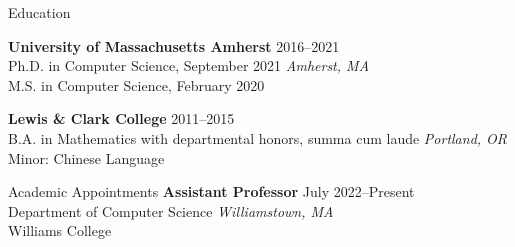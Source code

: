 \documentclass{resume} %
\begin{document}
%


\begin{rSection}{Education}

{\bf University of Massachusetts Amherst} \hfill {2016--2021} \\ 
Ph.D. in Computer Science, September 2021 \hfill {\em Amherst, MA} \\
M.S. in Computer Science, February 2020
 

{\bf Lewis \& Clark College} \hfill {2011--2015} \\ 
B.A. in Mathematics with departmental honors, summa cum laude \hfill {\em Portland, OR} \\
Minor: Chinese Language
\end{rSection}

\begin{rSection}{Academic Appointments}
{\bf Assistant Professor} \hfill {July 2022--Present} \\
Department of Computer Science \hfill {\em Williamstown, MA} \\ 
 Williams College
\end{rSection}

\end{document}
